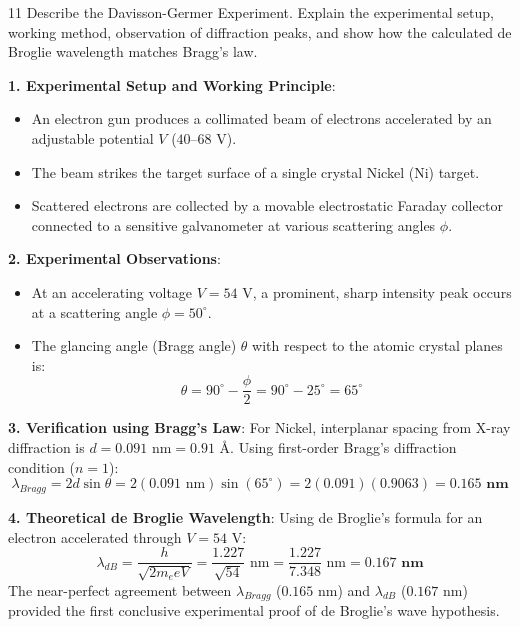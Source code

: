 \begin{theoryq}{11}
Describe the Davisson-Germer Experiment. Explain the experimental setup, working method, observation of diffraction peaks, and show how the calculated de Broglie wavelength matches Bragg's law.
\end{theoryq}
\begin{theorysol}
\textbf{1. Experimental Setup and Working Principle}:
\begin{itemize}
\item An electron gun produces a collimated beam of electrons accelerated by an adjustable potential $V$ ($40\text{--}68\text{ V}$).
\item The beam strikes the target surface of a single crystal Nickel (Ni) target.
\item Scattered electrons are collected by a movable electrostatic Faraday collector connected to a sensitive galvanometer at various scattering angles $\phi$.
\end{itemize}

\textbf{2. Experimental Observations}:
\begin{itemize}
\item At an accelerating voltage $V = 54\text{ V}$, a prominent, sharp intensity peak occurs at a scattering angle $\phi = 50^\circ$.
\item The glancing angle (Bragg angle) $\theta$ with respect to the atomic crystal planes is:
\begin{equation}
\theta = 90^\circ - \frac{\phi}{2} = 90^\circ - 25^\circ = 65^\circ
\end{equation}
\end{itemize}

\textbf{3. Verification using Bragg's Law}:
For Nickel, interplanar spacing from X-ray diffraction is $d = 0.091\text{ nm} = 0.91\text{ \AA}$.
Using first-order Bragg's diffraction condition ($n=1$):
\begin{equation}
\lambda_{Bragg} = 2d \sin\theta = 2(0.091\text{ nm}) \sin(65^\circ) = 2(0.091)(0.9063) = \mathbf{0.165\text{ nm}}
\end{equation}

\textbf{4. Theoretical de Broglie Wavelength}:
Using de Broglie's formula for an electron accelerated through $V = 54\text{ V}$:
\begin{equation}
\lambda_{dB} = \frac{h}{\sqrt{2 m_e e V}} = \frac{1.227}{\sqrt{54}}\text{ nm} = \frac{1.227}{7.348}\text{ nm} = \mathbf{0.167\text{ nm}}
\end{equation}
The near-perfect agreement between $\lambda_{Bragg}$ ($0.165\text{ nm}$) and $\lambda_{dB}$ ($0.167\text{ nm}$) provided the first conclusive experimental proof of de Broglie's wave hypothesis.
\end{theorysol}
\vspace{4mm}

